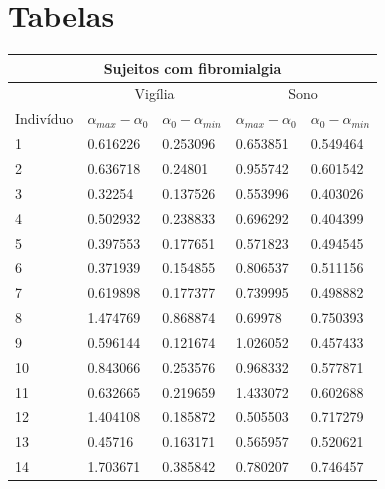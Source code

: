 \documentclass{ufscThesis}
\begin{document}



\apendice
\chapter{Tabelas}

\begin{table}[h]
\centering
\begin{tabular}{|l|l|l|l|l|}
\hline
\multicolumn{5}{|c|}{Sujeitos com fibromialgia}                                       \\ \hline
           & \multicolumn{2}{c|}{Vigília} & \multicolumn{2}{c|}{Sono}    \\ \hline
Indivíduo & $\alpha_{max} - \alpha_{0}$ & $\alpha_{0} - \alpha_{min}$ & $\alpha_{max} - \alpha_{0}$ & $\alpha_{0} - \alpha_{min}$ \\ \hline
1          & 0.616226     & 0.253096      & 0.653851     & 0.549464      \\ \hline
2          & 0.636718     & 0.24801       & 0.955742     & 0.601542      \\ \hline
3          & 0.32254      & 0.137526      & 0.553996     & 0.403026      \\ \hline
4          & 0.502932     & 0.238833      & 0.696292     & 0.404399      \\ \hline
5          & 0.397553     & 0.177651      & 0.571823     & 0.494545      \\ \hline
6          & 0.371939     & 0.154855      & 0.806537     & 0.511156      \\ \hline
7          & 0.619898     & 0.177377      & 0.739995     & 0.498882      \\ \hline
8          & 1.474769     & 0.868874      & 0.69978      & 0.750393      \\ \hline
9          & 0.596144     & 0.121674      & 1.026052     & 0.457433      \\ \hline
10         & 0.843066     & 0.253576      & 0.968332     & 0.577871      \\ \hline
11         & 0.632665     & 0.219659      & 1.433072     & 0.602688      \\ \hline
12         & 1.404108     & 0.185872      & 0.505503     & 0.717279      \\ \hline
13         & 0.45716      & 0.163171      & 0.565957     & 0.520621      \\ \hline
14         & 1.703671     & 0.385842      & 0.780207     & 0.746457      \\ \hline

\end{tabular}
\end{table}
\end{document}
